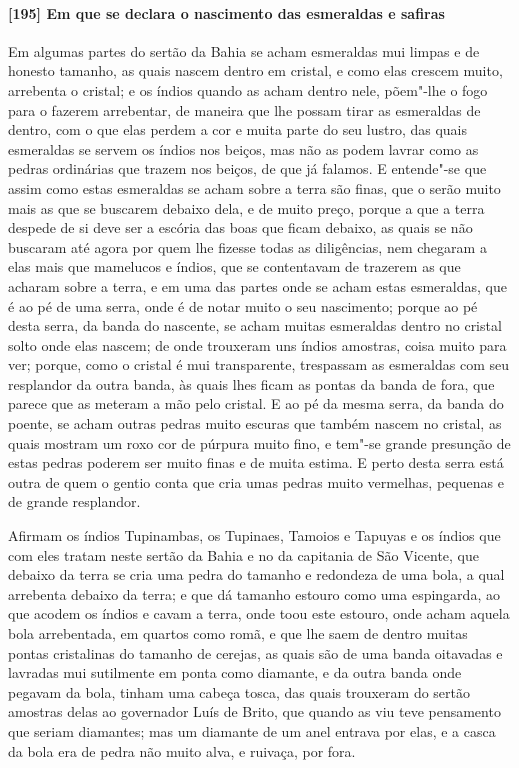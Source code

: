 \paragraph{[195] Em que se declara o nascimento das esmeraldas e safiras}\quad
Em algumas partes do sertão da Bahia se acham esmeraldas mui limpas e de honesto tamanho,
as quais nascem dentro em cristal, e como elas crescem muito, arrebenta o cristal; e os
índios quando as acham dentro nele, põem"-lhe o fogo para o fazerem arrebentar, de maneira
que lhe possam tirar as esmeraldas de dentro, com o que elas perdem a cor e muita parte do
seu lustro, das quais esmeraldas se servem os índios nos beiços, mas não as podem lavrar
como as pedras ordinárias que trazem nos beiços, de que já falamos. E entende"-se que assim
como estas esmeraldas se acham sobre a terra são finas, que o serão muito mais as que se
buscarem debaixo dela, e de muito preço, porque a que a terra despede de si deve ser a
escória das boas que ficam debaixo, as quais se não buscaram até agora por quem lhe
fizesse todas as diligências, nem chegaram a elas mais que mamelucos e índios, que se
contentavam de trazerem as que acharam sobre a terra, e em uma das partes onde se acham
estas esmeraldas, que é ao pé de uma serra, onde é de notar muito o seu nascimento; porque
ao pé desta serra, da banda do nascente, se acham muitas esmeraldas dentro no cristal
solto onde elas nascem; de onde trouxeram uns índios amostras, coisa muito para ver;
porque, como o cristal é mui transparente, trespassam as esmeraldas com seu resplandor da
outra banda, às quais lhes ficam as pontas da banda de fora, que parece que as meteram a
mão pelo cristal. E ao pé da mesma serra, da banda do poente, se acham outras pedras muito
escuras que também nascem no cristal, as quais mostram um roxo cor de púrpura muito fino,
e tem"-se grande presunção de estas pedras poderem ser muito finas e de muita estima. E
perto desta serra está outra de quem o gentio conta que cria umas pedras muito vermelhas,
pequenas e de grande resplandor.

Afirmam os índios Tupinambas, os Tupinaes, Tamoios e Tapuyas e os índios que com eles
tratam neste sertão da Bahia e no da capitania de São Vicente, que debaixo da terra se
cria uma pedra do tamanho e redondeza de uma bola, a qual arrebenta debaixo da terra; e
que dá tamanho estouro como uma espingarda, ao que acodem os índios e cavam a terra, onde
toou este estouro, onde acham aquela bola arrebentada, em quartos como romã, e que lhe
saem de dentro muitas pontas cristalinas do tamanho de cerejas, as quais são de uma banda
oitavadas e lavradas mui sutilmente em ponta como diamante, e da outra banda onde pegavam
da bola, tinham uma cabeça tosca, das quais trouxeram do sertão amostras delas ao
governador Luís de Brito, que quando as viu teve pensamento que seriam diamantes; mas um
diamante de um anel entrava por elas, e a casca da bola era de pedra não muito alva, e
ruivaça, por fora.

